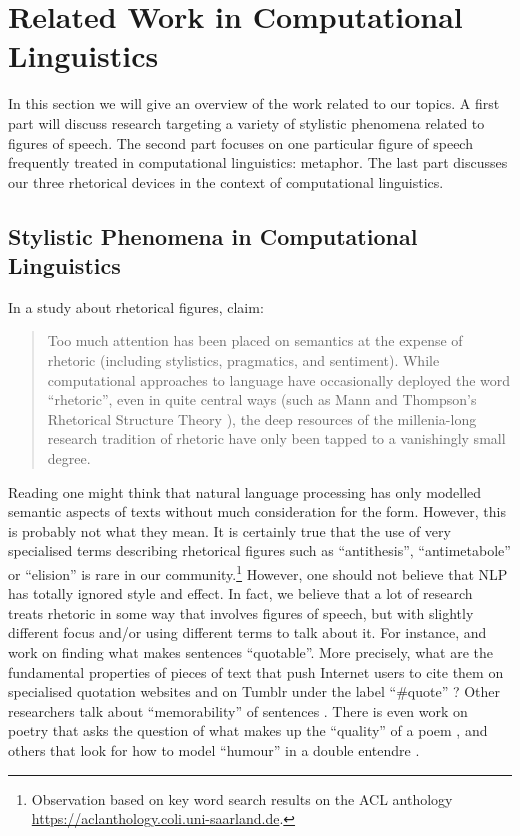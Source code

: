 \section{Related Work in Computational Linguistics}
In this section we will give an overview of the work related to our topics. A first part will discuss research targeting a variety of stylistic phenomena related to figures of speech. The second part focuses on one particular figure of speech frequently treated in computational linguistics: metaphor. The last part discusses our three rhetorical devices in the context of computational linguistics.

\subsection{Stylistic Phenomena in Computational Linguistics}

In a study about rhetorical figures, \cite{harris2009} claim:
\begin{quotation}
Too much attention has been placed on semantics at the expense of rhetoric (including stylistics, pragmatics, and sentiment). While computational approaches to language have occasionally deployed the word ``rhetoric'', even in quite central ways (such as Mann and Thompson's Rhetorical Structure Theory \citep{Mann1988a}), the deep resources of the millenia-long research tradition of rhetoric have only been tapped to a vanishingly small degree.
\end{quotation}
\noindent
Reading \cite{harris2009} one might think that natural language processing has only modelled semantic aspects of texts without much consideration for the form. However, this is probably not what they mean. It is certainly true that the use of very specialised terms describing rhetorical figures such as ``antithesis'', ``antimetabole'' or ``elision'' is rare in our community.\footnote{Observation based on key word search results on the ACL anthology \\\url{https://aclanthology.coli.uni-saarland.de}.} However, one should not believe that NLP has totally ignored style and effect. In fact, we believe that a lot of research treats rhetoric in some way that involves figures of speech, but with slightly different focus and/or using different terms to talk about it. For instance, \citet{Booten2016} and \citet{Bendersky2012} work on finding what makes sentences ``quotable''. More precisely, what are the fundamental properties of pieces of text that push Internet users to cite them on specialised quotation websites \citep{Bendersky2012} and on Tumblr under the label ``\#quote'' \citep{Booten2016}? Other researchers talk about ``memorability'' of sentences \citep{Danescu-Niculescu-Mizil+al:12b}. %
There is even work on poetry that asks the question of what makes up the ``quality'' of a poem \citep{Kao2012}, and others that look for how to model ``humour'' in a double entendre \citep{Kiddon2011a}. 

